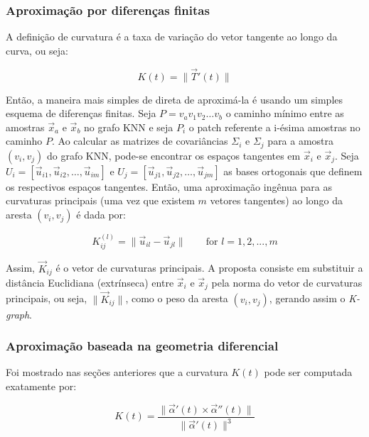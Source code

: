 \documentclass[a4paper,12pt]{article}
\begin{document}
\subsubsection{Aproximação por diferenças finitas}

A definição de curvatura é a taxa de variação do vetor tangente ao longo da curva, ou seja:

\begin{equation}
	K(t) = \lVert \vec{T}'(t) \rVert
\end{equation}

Então, a maneira mais simples de direta de aproximá-la é usando um simples esquema de diferenças finitas. Seja $P = v_a v_1 v_2 \ldots v_b$ o caminho mínimo entre as amostras $\vec{x}_a$ e $\vec{x}_b$ no grafo KNN e seja  $P_i$ o patch referente a i-ésima amostras no caminho $P$. Ao calcular as matrizes de covariâncias $\Sigma_i$ e $\Sigma_j$ para a amostra $(v_i, v_j)$ do grafo KNN, pode-se encontrar os espaços tangentes em $\vec{x}_i$ e $\vec{x}_j$. Seja $U_i = \left[ \vec{u}_{i1} , \vec{u}_{i2} , \ldots, \vec{u}_{im} \right]$ e $U_j = \left[ \vec{u}_{j1} , \vec{u}_{j2} , \ldots, \vec{u}_{jm} \right]$ as bases ortogonais que definem os respectivos espaços tangentes. Então, uma aproximação ingênua para as curvaturas principais (uma vez que existem $m$ vetores tangentes) ao longo da aresta $(v_i, v_j)$ é dada por:

\begin{equation}
	K_{ij}^{(l)} = \lVert \vec{u}_{il} - \vec{u}_{jl} \rVert \qquad \text{for } l = 1, 2, ..., m
\end{equation}

Assim, $\vec{K}_{ij}$ é o vetor de curvaturas principais. A proposta consiste em substituir a distância Euclidiana (extrínseca) entre $\vec{x}_i$ e $\vec{x}_j$ pela norma do vetor de curvaturas principais, ou seja, $\lVert \vec{K}_{ij} \rVert$, como o peso da aresta $(v_i, v_j)$, gerando assim o \emph{K-graph}.

\subsubsection{Aproximação baseada na geometria diferencial}

Foi mostrado nas seções anteriores que a curvatura $K(t)$ pode ser computada exatamente por:

\begin{equation}
	K(t) = \frac{ \lVert \vec{\alpha}'(t) \times \vec{\alpha}''(t) \rVert }{ \lVert \vec{\alpha}'(t) \rVert^3 }
	\label{eq:K}
\end{equation}
\end{document}
